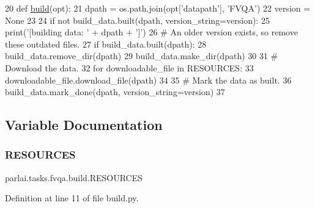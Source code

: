\begin{DoxyCode}
20 \textcolor{keyword}{def }\hyperlink{namespacedialog__babi__feedback_1_1build_a7a9d289f7493a5ded13c4b7f071b6184}{build}(opt):
21     dpath = os.path.join(opt[\textcolor{stringliteral}{'datapath'}], \textcolor{stringliteral}{'FVQA'})
22     version = \textcolor{keywordtype}{None}
23 
24     \textcolor{keywordflow}{if} \textcolor{keywordflow}{not} build\_data.built(dpath, version\_string=version):
25         print(\textcolor{stringliteral}{'[building data: '} + dpath + \textcolor{stringliteral}{']'})
26         \textcolor{comment}{# An older version exists, so remove these outdated files.}
27         \textcolor{keywordflow}{if} build\_data.built(dpath):
28             build\_data.remove\_dir(dpath)
29         build\_data.make\_dir(dpath)
30 
31         \textcolor{comment}{# Download the data.}
32         \textcolor{keywordflow}{for} downloadable\_file \textcolor{keywordflow}{in} RESOURCES:
33             downloadable\_file.download\_file(dpath)
34 
35         \textcolor{comment}{# Mark the data as built.}
36         build\_data.mark\_done(dpath, version\_string=version)
37 \end{DoxyCode}


\subsection{Variable Documentation}
\mbox{\label{namespaceparlai_1_1tasks_1_1fvqa_1_1build_a3a0a95207c9b0e2b156abe6c613c97f3}} 
\subsubsection{\texorpdfstring{R\+E\+S\+O\+U\+R\+C\+ES}{RESOURCES}}
{\footnotesize\ttfamily parlai.\+tasks.\+fvqa.\+build.\+R\+E\+S\+O\+U\+R\+C\+ES}



Definition at line 11 of file build.\+py.

